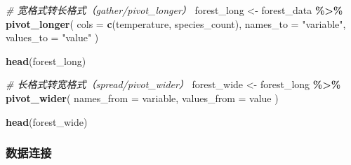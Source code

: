 \documentclass[
]{book}
\newenvironment{Shaded}{\begin{snugshade}}{\end{snugshade}}
\newcommand{\AttributeTok}[1]{\textcolor[rgb]{0.13,0.29,0.53}{#1}}
\newcommand{\CommentTok}[1]{\textcolor[rgb]{0.56,0.35,0.01}{\textit{#1}}}
\newcommand{\FunctionTok}[1]{\textcolor[rgb]{0.13,0.29,0.53}{\textbf{#1}}}
\newcommand{\NormalTok}[1]{#1}
\newcommand{\OtherTok}[1]{\textcolor[rgb]{0.56,0.35,0.01}{#1}}
\newcommand{\SpecialCharTok}[1]{\textcolor[rgb]{0.81,0.36,0.00}{\textbf{#1}}}
\newcommand{\StringTok}[1]{\textcolor[rgb]{0.31,0.60,0.02}{#1}}
\begin{document}
\begin{Shaded}
\begin{Highlighting}[]
\CommentTok{\# 宽格式转长格式（gather/pivot\_longer）}
\NormalTok{forest\_long }\OtherTok{\textless{}{-}}\NormalTok{ forest\_data }\SpecialCharTok{\%\textgreater{}\%}
  \FunctionTok{pivot\_longer}\NormalTok{(}
    \AttributeTok{cols =} \FunctionTok{c}\NormalTok{(temperature, species\_count),}
    \AttributeTok{names\_to =} \StringTok{"variable"}\NormalTok{,}
    \AttributeTok{values\_to =} \StringTok{"value"}
\NormalTok{  )}

\FunctionTok{head}\NormalTok{(forest\_long)}

\CommentTok{\# 长格式转宽格式（spread/pivot\_wider）}
\NormalTok{forest\_wide }\OtherTok{\textless{}{-}}\NormalTok{ forest\_long }\SpecialCharTok{\%\textgreater{}\%}
  \FunctionTok{pivot\_wider}\NormalTok{(}
    \AttributeTok{names\_from =}\NormalTok{ variable,}
    \AttributeTok{values\_from =}\NormalTok{ value}
\NormalTok{  )}

\FunctionTok{head}\NormalTok{(forest\_wide)}
\end{Highlighting}
\end{Shaded}

\hypertarget{ux6570ux636eux8fdeux63a5}{%
\subsubsection{数据连接}\label{ux6570ux636eux8fdeux63a5}}
\end{document}
